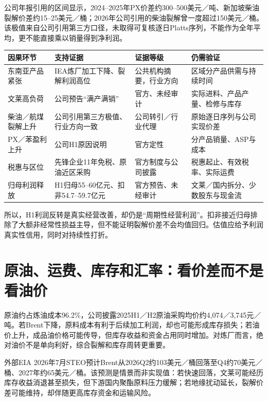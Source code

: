 公司年报引用的区间显示，2024--2025年PX价差约300--500美元／吨、新加坡柴油裂解价差约15--25美元／桶；2026年公司引用的柴油裂解曾一度超过150美元／桶。该极值来自公司引用第三方口径，未取得可复核逐日Platts序列，不能作为全年平均，更不能直接乘以销量得到净利润。

\begin{exhibitbox}[H1利润爆发的因果链与证据等级]
\small
\noindent\begin{tabularx}{\textwidth}{L{2.8cm}L{2.65cm}L{2.65cm}X}
\toprule
\textbf{因果环节} & \textbf{支持证据} & \textbf{证据等级} & \textbf{仍需验证} \\
\midrule
东南亚产品紧张 & IEA炼厂加工下降、裂解利润高位 & 公共机构摘要，行业方向 & 区域分产品供需与持续时间 \\
文莱高负荷 & 公司预告“满产满销” & 官方、未经审计 & 实际进料、产品产量、检修与库存 \\
柴油／航煤裂解上升 & 公司引用第三方极值、行业方向一致 & 公司转引／行业代理 & 原始逐日序列与公司实现价差 \\
PX／苯盈利上升 & 公司H1原因说明 & 官方定性 & 分产品销量、ASP与成本 \\
税惠与区位 & 先锋企业11年免税、原油近区采购 & 官方制度与公司披露 & 税惠起止、有效税率、实际运费 \\
归母利润释放 & H1归母55--60亿元、扣非54.7--59.7亿元 & 官方预告、未经审计 & 文莱／国内拆分、少数股东与现金流 \\
\bottomrule
\end{tabularx}
\end{exhibitbox}

所以，H1利润反转是真实经营改善，却仍是“周期性经营利润”。扣非接近归母排除了大额非经常性损益主导，但不能证明裂解价差不会均值回归。估值应给予利润真实性信用，同时对持续性打折。

\section{原油、运费、库存和汇率：看价差而不是看油价}

原油约占炼油成本96.2\%，公司披露2025H1／H2原油采购均价约4,074／3,745元／吨。若Brent下降，原料成本有利于后续加工利润，却也可能形成库存损失；若油价上升，成品油价格可能传导，但库存收益和资金占用同时增加。对炼厂而言，绝对油价不是单向利好，综合裂解和库存周转更重要。

外部EIA 2026年7月STEO预计Brent从2026Q2约103美元／桶回落至Q4约70美元／桶、2027年约65美元／桶。该预测是情景而非实现值：若快速回落，文莱可能经历库存收益消退甚至损失，但下游国内聚酯原料压力缓解；若地缘扰动延长，裂解价差可能维持，却伴随更高库存资金和运输风险。


